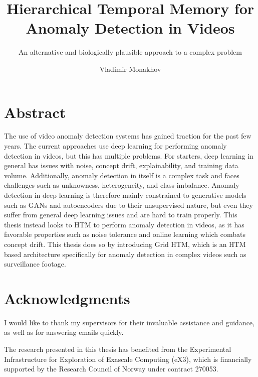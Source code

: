 \documentclass[USenglish]{ifimaster}  %
\title{Hierarchical Temporal Memory for Anomaly Detection in Videos}
\subtitle{An alternative and biologically plausible approach to a complex problem }         %
\author{Vladimir Monakhov}                      %
\begin{document}
\duoforside[
  dept={Department of Informatics},   %
  program={Informatics: Robotics and Intelligent Systems},         %
  long
]                                        %

\frontmatter{}
\mainmatter{}

\chapter*{Abstract} 
The use of video anomaly detection systems has gained traction for the past few years. The current approaches use deep learning for performing anomaly detection in videos, but this has multiple problems. For starters, deep learning in general has issues with noise, concept drift, explainability, and training data volume. Additionally, anomaly detection in itself is a complex task and faces challenges such as unknowness, heterogeneity, and class imbalance. Anomaly detection in deep learning is therefore mainly constrained to generative models such as GANs and autoencoders due to their unsupervised nature, but even they suffer from general deep learning issues and are hard to train properly. This thesis instead looks to HTM to perform anomaly detection in videos, as it has favorable properties such as noise tolerance and online learning which combats concept drift. This thesis does so by introducing Grid HTM, which is an HTM based architecture specifically for anomaly detection in complex videos such as surveillance footage.
\chapter*{Acknowledgments} 
I would like to thank my supervisors for their invaluable assistance and guidance, as well as for answering emails quickly.
\par
The research presented in this thesis has benefited from the Experimental Infrastructure for Exploration of Exascale Computing (eX3), which is financially supported by the Research Council of Norway under contract 270053.
\end{document}
